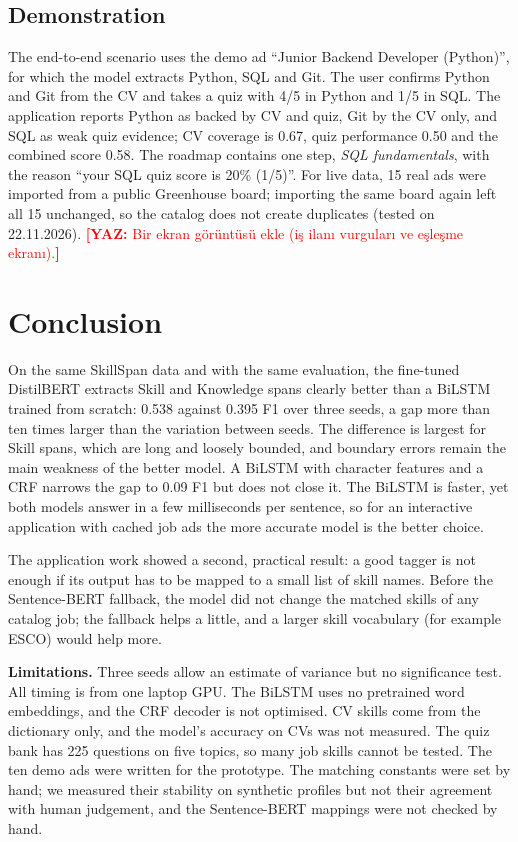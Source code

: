 \documentclass[runningheads]{llncs}
\newcommand{\yaz}[1]{\textcolor{red}{\textbf{[YAZ:} #1\textbf{]}}}
\begin{document}
\subsection{Demonstration}
The end-to-end scenario uses the demo ad ``Junior Backend Developer (Python)'', for which the model
extracts Python, SQL and Git. The user confirms Python and Git from the CV and takes a quiz with 4/5
in Python and 1/5 in SQL. The application reports Python as backed by CV and quiz, Git by the CV only,
and SQL as weak quiz evidence; CV coverage is 0.67, quiz performance 0.50 and the combined score 0.58.
The roadmap contains one step, \emph{SQL fundamentals}, with the reason ``your SQL quiz score is 20\%
(1/5)''. For live data, 15 real ads were imported from a public Greenhouse board; importing the same
board again left all 15 unchanged, so the catalog does not create duplicates (tested on 22.11.2026).
\yaz{Bir ekran görüntüsü ekle (iş ilanı vurguları ve eşleşme ekranı).}

\section{Conclusion}\label{sec:concl}
On the same SkillSpan data and with the same evaluation, the fine-tuned DistilBERT extracts Skill and
Knowledge spans clearly better than a BiLSTM trained from scratch: 0.538 against 0.395 F1 over three
seeds, a gap more than ten times larger than the variation between seeds. The difference is largest for
Skill spans, which are long and loosely bounded, and boundary errors remain the main weakness of the
better model. A BiLSTM with character features and a CRF narrows the gap to 0.09 F1 but does not close
it. The BiLSTM is faster, yet both models answer in a few milliseconds per sentence, so for an
interactive application with cached job ads the more accurate model is the better choice.

The application work showed a second, practical result: a good tagger is not enough if its output has
to be mapped to a small list of skill names. Before the Sentence-BERT fallback, the model did not change
the matched skills of any catalog job; the fallback helps a little, and a larger skill vocabulary (for
example ESCO) would help more.

\textbf{Limitations.} Three seeds allow an estimate of variance but no significance test. All timing is
from one laptop GPU. The BiLSTM uses no pretrained word embeddings, and the CRF decoder is not
optimised. CV skills come from the dictionary only, and the model's accuracy on CVs was not measured.
The quiz bank has 225 questions on five topics, so many job skills cannot be tested. The ten demo ads
were written for the prototype. The matching constants were set by hand; we measured their stability
on synthetic profiles but not their agreement with human judgement, and the Sentence-BERT mappings were
not checked by hand.
\end{document}
